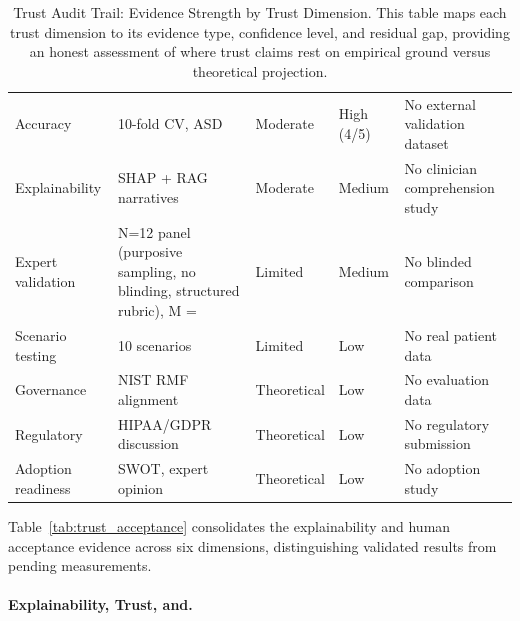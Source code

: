\begin{table}[H]
\tablestripes\tablefontsize
\tablefontsize
\centering
\caption[Trust Audit Trail: Evidence Strength by Trust Dimension]{Trust Audit Trail: Evidence Strength by Trust Dimension. This table maps each trust dimension to its evidence type, confidence level, and residual gap, providing an honest assessment of where trust claims rest on empirical ground versus theoretical projection.}
\begin{tabularx}{\textwidth}{@{} >{\raggedright\arraybackslash}p{1.8cm} L >{\raggedright\arraybackslash}p{1.4cm} >{\raggedright\arraybackslash}p{1.2cm} L @{}}
\toprule
{} &  &  &  &  \\
\midrule
Accuracy & 10-fold CV, ASD & Moderate & High (4/5) & No external validation dataset \\
Explainability & SHAP + RAG narratives & Moderate & Medium & No clinician comprehension study \\
Expert validation & N=12 panel (purposive sampling, no blinding, structured rubric), M = \expertM{} & Limited & Medium & No blinded comparison \\
Scenario testing & 10 scenarios & Limited & Low & No real patient data \\
Governance & NIST RMF alignment & Theoretical & Low & No evaluation data \\
Regulatory & HIPAA/GDPR discussion & Theoretical & Low & No regulatory submission \\
Adoption readiness & SWOT, expert opinion & Theoretical & Low & No adoption study \\
\bottomrule
\end{tabularx}
\end{table}

Table~\ref{tab:trust_acceptance} consolidates the explainability and human acceptance evidence across six dimensions, distinguishing validated results from pending measurements.

\paragraph{Explainability, Trust, and.}



